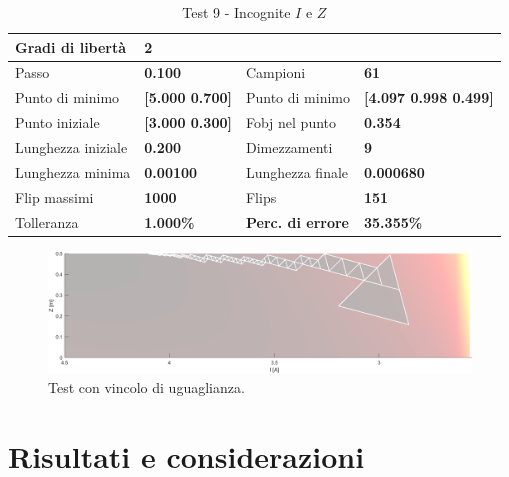 \documentclass[a4paper, 11pt]{article}
\begin{document}
\begin{table}[h]
    \caption{Test 9 - Incognite $I$ e $Z$}
    \begin{center}
    \begin{tabular}{|l|l|l|l|} 
    \hline 
Gradi di libertà & \textbf{2} &  &  \\ \hline 
Passo & \textbf{0.100} & Campioni & \textbf{61} \\ \hline 
Punto di minimo & \textbf{{[}5.000 0.700{]}} & Punto di minimo &
\textbf{{[}4.097 0.998 0.499{]}} \\ \hline 
Punto iniziale & \textbf{{[}3.000 0.300{]}} & Fobj nel punto & \textbf{0.354} \\
\hline 
Lunghezza iniziale & \textbf{0.200} & Dimezzamenti & \textbf{9} \\ \hline 
Lunghezza minima & \textbf{0.00100} & Lunghezza finale & \textbf{0.000680} \\
\hline
Flip massimi & \textbf{1000} & Flips & \textbf{151} \\ \hline 
Tolleranza & \textbf{1.000\%} & \textbf{Perc. di errore} & \textbf{35.355\%} \\
\hline 
    \end{tabular} 
    \end{center}
    \end{table}




\begin{figure}[H]
    \centering
        \includegraphics[width=15cm]{assets/figure11}
        \caption{Test con vincolo di uguaglianza.}
\end{figure}

\newpage
\section*{Risultati e considerazioni}
\end{document}
